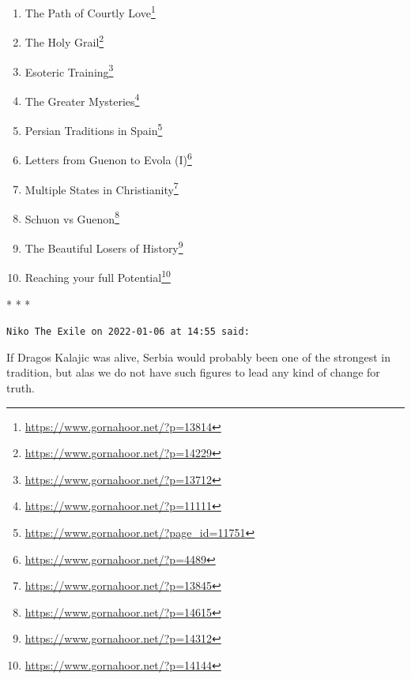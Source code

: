 \begin{enumerate}


\item The Path of Courtly Love\footnote{\url{https://www.gornahoor.net/?p=13814}}

\item The Holy Grail\footnote{\url{https://www.gornahoor.net/?p=14229}}

\item Esoteric Training\footnote{\url{https://www.gornahoor.net/?p=13712}}

\item The Greater Mysteries\footnote{\url{https://www.gornahoor.net/?p=11111}}

\item Persian Traditions in Spain\footnote{\url{https://www.gornahoor.net/?page\_id=11751}}

\item Letters from Guenon to Evola (I)\footnote{\url{https://www.gornahoor.net/?p=4489}}

\item Multiple States in Christianity\footnote{\url{https://www.gornahoor.net/?p=13845}}

\item Schuon vs Guenon\footnote{\url{https://www.gornahoor.net/?p=14615}}

\item The Beautiful Losers of History\footnote{\url{https://www.gornahoor.net/?p=14312}}

\item Reaching your full Potential\footnote{\url{https://www.gornahoor.net/?p=14144}}
\end{enumerate}




\begin{center}* * *\end{center}

\begin{footnotesize}
\begin{sffamily}
\texttt{Niko The Exile on 2022-01-06 at 14:55 said:}

If Dragos Kalajic was alive, Serbia would probably been one of the strongest in tradition, but alas we do not have such figures to lead any kind of change for truth.


\hfill

\end{sffamily}
\end{footnotesize}

